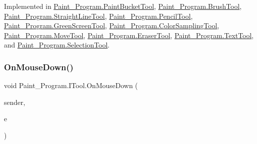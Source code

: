 Implemented in \mbox{\hyperlink{class_paint___program_1_1_paint_bucket_tool_ad41b8e00b3715186451c6caadc595db8}{Paint\+\_\+\+Program.\+Paint\+Bucket\+Tool}}, \mbox{\hyperlink{class_paint___program_1_1_brush_tool_a854fff02dd8dfc6016dcb91b4f7d08f9}{Paint\+\_\+\+Program.\+Brush\+Tool}}, \mbox{\hyperlink{class_paint___program_1_1_straight_line_tool_aa4fa3f224adf151dd9dbbb97282cc989}{Paint\+\_\+\+Program.\+Straight\+Line\+Tool}}, \mbox{\hyperlink{class_paint___program_1_1_pencil_tool_abb49751775484b9fcd8ce2e20de98763}{Paint\+\_\+\+Program.\+Pencil\+Tool}}, \mbox{\hyperlink{class_paint___program_1_1_green_screen_tool_a94a122c3229b5f530531228837234eb0}{Paint\+\_\+\+Program.\+Green\+Screen\+Tool}}, \mbox{\hyperlink{class_paint___program_1_1_color_sampling_tool_a9ee3268dc9b5e8f36696055519a78a4c}{Paint\+\_\+\+Program.\+Color\+Sampling\+Tool}}, \mbox{\hyperlink{class_paint___program_1_1_move_tool_a0d0d62c93c2242302143c55071231054}{Paint\+\_\+\+Program.\+Move\+Tool}}, \mbox{\hyperlink{class_paint___program_1_1_eraser_tool_a4093d09a604ab0f535497b64447a0013}{Paint\+\_\+\+Program.\+Eraser\+Tool}}, \mbox{\hyperlink{class_paint___program_1_1_text_tool_a053b13ff961f302f816b57ab5c48952a}{Paint\+\_\+\+Program.\+Text\+Tool}}, and \mbox{\hyperlink{class_paint___program_1_1_selection_tool_a04d5a1f8ed1eb4fb786a09cf122b0200}{Paint\+\_\+\+Program.\+Selection\+Tool}}.

\mbox{\label{interface_paint___program_1_1_i_tool_a73d8797f4f2b1e0d8efe8aadcd44e840}} 
\subsubsection{\texorpdfstring{On\+Mouse\+Down()}{OnMouseDown()}}
{\footnotesize\ttfamily void Paint\+\_\+\+Program.\+I\+Tool.\+On\+Mouse\+Down (\begin{DoxyParamCaption}\item[{object}]{sender,  }\item[{Mouse\+Event\+Args}]{e }\end{DoxyParamCaption})}



